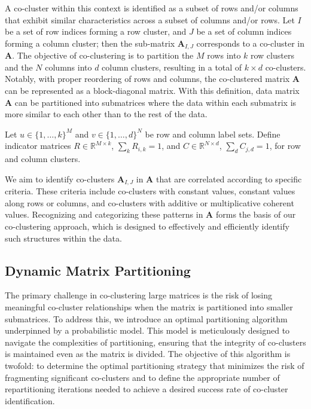 A co-cluster within this context is identified as a subset of rows and/or columns that exhibit similar characteristics across a subset of columns and/or rows. Let $I$ be a set of row indices forming a row cluster, and $J$ be a set of column indices forming a column cluster; then the sub-matrix $\mathbf{A}_{I,J}$ corresponds to a co-cluster in $\mathbf{A}$. The objective of co-clustering is to partition the $M$ rows into $k$ row clusters and the $N$ columns into $d$ column clusters, resulting in a total of $k \times d$ co-clusters.
Notably, with proper reordering of rows and columns, the co-clustered matrix $\mathbf{A}$ can be represented as a block-diagonal matrix.
With this definition, data matrix $\mathbf{A}$ can be partitioned into submatrices where the data within each submatrix is more similar to each other than to the rest of the data.


Let \( u \in \{1,\dots,k\}^M \) and \( v \in \{1,\dots,d\}^N \) be row and column label sets. Define indicator matrices \( R \in \mathbb{R}^{M \times k} \), \( \sum_k R_{i,k} = 1 \), and \( C \in \mathbb{R}^{N \times d} \), \( \sum_d C_{j,d} = 1 \), for row and column clusters.

We aim to identify co-clusters $\mathbf{A}_{I,J}$ in $\mathbf{A}$ that are correlated according to specific criteria. These criteria include co-clusters with constant values, constant values along rows or columns, and co-clusters with additive or multiplicative coherent values. Recognizing and categorizing these patterns in $\mathbf{A}$ forms the basis of our co-clustering approach, which is designed to effectively and efficiently identify such structures within the data.

\subsection{Dynamic Matrix Partitioning}
The primary challenge in co-clustering large matrices is the risk of losing meaningful co-cluster relationships when the matrix is partitioned into smaller submatrices. To address this, we introduce an optimal partitioning algorithm underpinned by a probabilistic model. This model is meticulously designed to navigate the complexities of partitioning, ensuring that the integrity of co-clusters is maintained even as the matrix is divided. The objective of this algorithm is twofold: to determine the optimal partitioning strategy that minimizes the risk of fragmenting significant co-clusters and to define the appropriate number of repartitioning iterations needed to achieve a desired success rate of co-cluster identification.


